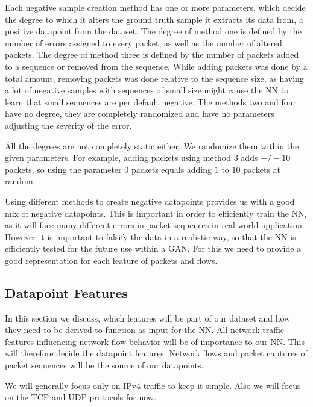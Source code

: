 \documentclass[
	ngerman,
	ruledheaders=section,%
	class=report,%
	thesis={type=bachelor},%
	accentcolor=9c,%
	custommargins=true,%
	marginpar=false,%
	parskip=half-,%
	fontsize=11pt,%
]{tudapub}
\begin{document}
Each negative sample creation method has one or more parameters, which decide the degree to which it alters the ground truth sample it extracts its data from, a positive datapoint from the dataset.
The degree of method one is defined by the number of errors assigned to every packet, as well as the number of altered packets.
The degree of method three is defined by the number of packets added to a sequence or removed from the sequence.
While adding packets was done by a total amount, removing packets was done relative to the sequence size, as having a lot of negative samples with sequences of small size might cause the NN to learn that small sequences are per default negative.
The methods two and four have no degree, they are completely randomized and have no parameters adjusting the severity of the error.

All the degrees are not completely static either.
We randomize them within the given parameters.
For example, adding packets using method 3 adds $+/-10$ packets, so using the parameter $0$ packets equals adding $1$ to $10$ packets at random.

Using different methods to create negative datapoints provides us with a good mix of negative datapoints.
This is important in order to efficiently train the NN, as it will face many different errors in packet sequences in real world application.
However it is important to falsify the data in a realistic way, so that the NN is efficiently tested for the future use within a GAN.
For this we need to provide a good representation for each feature of packets and flows.

\subsection{Datapoint Features}
\label{sec:datapointFeatures}

In this section we discuss, which features will be part of our dataset and how they need to be derived to function as input for the NN.
All network traffic features influencing network flow behavior will be of importance to our NN.
This will therefore decide the datapoint features.
Network flows and packet captures of packet sequences will be the source of our datapoints.

We will generally focus only on IPv4 traffic to keep it simple.
Also we will focus on the TCP and UDP protocols for now.

\end{document}
